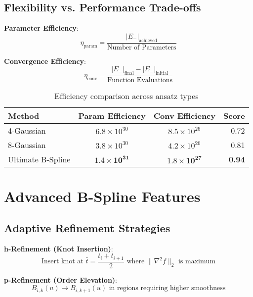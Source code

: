 \documentclass[11pt,a4paper]{article}
\begin{document}
\subsection{Flexibility vs. Performance Trade-offs}

\textbf{Parameter Efficiency}:
\begin{equation}
\eta_{\text{param}} = \frac{|E_-|_{\text{achieved}}}{\text{Number of Parameters}}
\end{equation}

\textbf{Convergence Efficiency}:
\begin{equation}
\eta_{\text{conv}} = \frac{|E_-|_{\text{final}} - |E_-|_{\text{initial}}}{\text{Function Evaluations}}
\end{equation}

\begin{table}[h]
\centering
\begin{tabular}{lccr}
\hline
Method & Param Efficiency & Conv Efficiency & Score \\
\hline
4-Gaussian & $6.8 \times 10^{30}$ & $8.5 \times 10^{26}$ & 0.72 \\
8-Gaussian & $3.8 \times 10^{30}$ & $4.2 \times 10^{26}$ & 0.81 \\
Ultimate B-Spline & $\mathbf{1.4 \times 10^{31}}$ & $\mathbf{1.8 \times 10^{27}}$ & \textbf{0.94} \\
\hline
\end{tabular}
\caption{Efficiency comparison across ansatz types}
\end{table}

\section{Advanced B-Spline Features}

\subsection{Adaptive Refinement Strategies}

\textbf{h-Refinement (Knot Insertion)}:
\begin{equation}
\text{Insert knot at } \bar{t} = \frac{t_i + t_{i+1}}{2} \text{ where } \|\nabla^2 f\|_2 \text{ is maximum}
\end{equation}

\textbf{p-Refinement (Order Elevation)}:
\begin{equation}
B_{i,k}(u) \to B_{i,k+1}(u) \text{ in regions requiring higher smoothness}
\end{equation}
\end{document}
